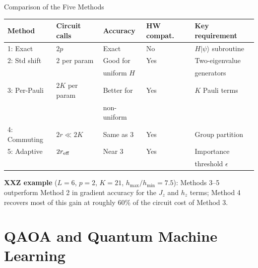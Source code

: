 \documentclass{beamer}
\begin{document}

\begin{frame}{Comparison of the Five Methods}
\begin{center}
\small
\begin{tabular}{lllll}
\hline
\textbf{Method} & \textbf{Circuit calls} & \textbf{Accuracy} &
  \textbf{HW compat.} & \textbf{Key requirement} \\
\hline
1: Exact & $2p$ & Exact & No & $H|\psi\rangle$ subroutine \\
2: Std shift & $2$ per param & Good for & Yes & Two-eigenvalue \\
             & & uniform $H$ & & generators \\
3: Per-Pauli & $2K$ per param & Better for & Yes & $K$ Pauli terms \\
             & & non-uniform & & \\
4: Commuting & $2r\ll 2K$ & Same as 3 & Yes & Group partition \\
5: Adaptive & $2r_{\rm eff}$ & Near 3 & Yes & Importance \\
            & & & & threshold $\epsilon$ \\
\hline
\end{tabular}
\end{center}

\medskip

\textbf{XXZ example} ($L=6$, $p=2$, $K=21$,
$h_{\max}/h_{\min}=7.5$):
Methods 3--5 outperform Method 2 in gradient accuracy for the
$J_z$ and $h_z$ terms; Method 4 recovers most of this gain
at roughly $60\%$ of the circuit cost of Method 3.
\end{frame}


\section{QAOA and Quantum Machine Learning}
\end{document}
